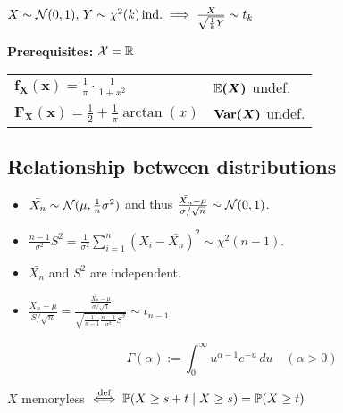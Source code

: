 \begin{lemma}
  \(X \sim \Normal(0, 1), \, Y \sim \chi^2(k) \, \text{ind.}\implies \frac{X}{\sqrt{\frac{1}{k}Y}} \sim t_k\)
\end{lemma}

\begin{cdefinition*}[{Cauchy}]
  \textbf{Prerequisites:} \(\DX = \R\) \\
  \begin{tabularx}{\linewidth}{@{}ll@{}}
    \(\bm{f_X(x)} = \frac{1}{\pi}\cdot \frac{1}{1 + x^2}\) & \(\bm{\E(X)}\) undef. \\
    \(\bm{F_X(x)} = \frac{1}{2} + \frac{1}{\pi} \arctan(x)\) & \(\bm{\Var(X)}\) undef.
  \end{tabularx}
\end{cdefinition*}

\subsection*{Relationship between distributions}
\begin{center}
  
\end{center}

\begin{theorem*}
  \begin{itemize}
    \item \(\bar{X_n} \sim \Normal(\mu, \frac{1}{n}\sigma^2)\) and thus \(\frac{\bar{X_n} - \mu}{\sigma / \sqrt{n}} \sim \Normal(0, 1)\).
    \item \(\frac{n-1}{\sigma^2}S^2 = \frac{1}{\sigma^2}\sum_{i=1}^n(X_i - \bar{X_n})^2 \sim \chi^2(n-1)\).
    \item \(\bar{X_n}\) and \(S^2\) are independent.
    \item \(\frac{\bar{X_n} - \mu}{S / \sqrt{n}} = \frac{\frac{\bar{X_n} - \mu}{\sigma / \sqrt{n}}}{\sqrt{\frac{1}{n-1} \frac{n-1}{\sigma^2}S^2}} \sim t_{n-1}\)
  \end{itemize}
\end{theorem*}

\begin{definition*} \vspace{-5pt}
  \[\Gamma(\alpha) := \int_0^\infty u^{\alpha-1}e^{-u} \, du \quad (\alpha > 0)\]
\end{definition*}

\begin{definition*}[Memorylessness]
  \(X\) memoryless \(\stackrel{\text{def}}{\iff} \P(X \geq s + t \mid X \geq s) = \P(X \geq t)\)
\end{definition*}
